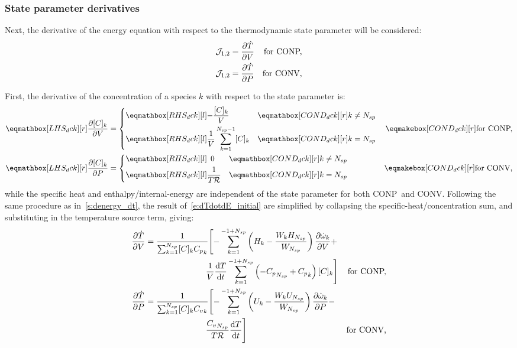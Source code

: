 \documentclass[12pt,number,sort&compress]{elsarticle}
\newcommand{\ns}{N_{sp}}
\newcommand{\conp}{CONP}
\newcommand{\conv}{CONV}
\newcommand{\dconp}{\ifmmode\text{for \conp,}\else for \conp,\fi}
\newcommand{\dconv}{\ifmmode\text{for \conv,}\else for \conv,\fi}
\newcommand{\Ru}{\mathcal{R}}
\begin{document}
\subsubsection{State parameter derivatives}
Next, the derivative of the energy equation with respect to the thermodynamic state parameter will be considered:
\begin{subequations}
\label{e:dTdotdE_initial}
\begin{align}
 \mathcal{J}_{1, 2} & = \frac{\partial\dot{T}}{\partial{V}} & \text{\dconp} \\
 \mathcal{J}_{1, 2} & = \frac{\partial\dot{T}}{\partial{P}} & \text{\dconv}
\end{align}
\end{subequations}

First, the derivative of the concentration of a species $k$ with respect to the state parameter is:
\begin{subequations}
 \label{e:dck_de}
 \begin{align}
 \lhs{dck}{\frac{\partial [C]_{k} }{\partial V }} &=
  \begin{dcases}
  \rhs{dck}{-\frac{[C]_{k}}{V}} & \mathcond{dck}{k \ne \ns} \\
  \rhs{dck}{\frac{1}{V} \sum_{k=1}^{\ns  - 1} [C]_{k}} & \mathcond{dck}{k = \ns}
 \end{dcases}&\cond{dck}{\dconp} \\
 \lhs{dck}{\frac{\partial [C]_{k} }{\partial P }} &=
 \begin{dcases}
   \rhs{dck}{\mathindent[s]0} & \mathcond{dck}{k \ne \ns} \\
   \rhs{dck}{\frac{1}{T \Ru}} & \mathcond{dck}{k = \ns}
 \end{dcases}&\cond{dck}{\dconv}
 \end{align}
\end{subequations}
while the specific heat and enthalpy\slash internal-energy are independent of the state parameter for both \conp~and \conv.
Following the same procedure as in~\cref{s:denergy_dt}, the result of~\cref{e:dTdotdE_initial} are simplified by collapsing the specific-heat\slash concentration sum, and substituting in the temperature source term, giving:
\begin{subequations}
\label{e:dTdotdE_nojac}
\begin{align}
 \frac{\partial\dot{T}}{\partial{V}} &= \frac{1}{\sum_{k=1}^{\ns} [C]_{k} {C_p}_{k}} \Biggl[ - \sum_{k=1}^{-1 + \ns} \left(H_{k} - \frac{W_{k} H_{\ns}}{W_{\ns}}\right) \frac{\partial \dot{\omega}_{k} }{\partial V } + & \nonumber \\
				     & \mathindent[largerindentand] \frac{1}{V} \frac{\text{d} T }{\text{d} t } \sum_{k=1}^{-1 + \ns} \left(- {C_p}_{\ns} + {C_p}_{k}\right) [C]_{k}\Biggr] & \text{\dconp} \\
 \frac{\partial\dot{T}}{\partial{P}} &= \frac{1}{\sum_{k=1}^{\ns} [C]_{k} {C_v}_{k}} \Biggl[- \sum_{k=1}^{-1 + \ns} \left(U_{k} - \frac{W_{k} U_{\ns}}{W_{\ns}}\right) \frac{\partial \dot{\omega}_{k} }{\partial P } - & \nonumber \\
				     & \mathindent[largerindentand] \frac{{C_v}_{\ns}}{T \Ru} \frac{\text{d} T }{\text{d} t } \Biggr] & \text{\dconv}
\end{align}
\end{subequations}
\end{document}
